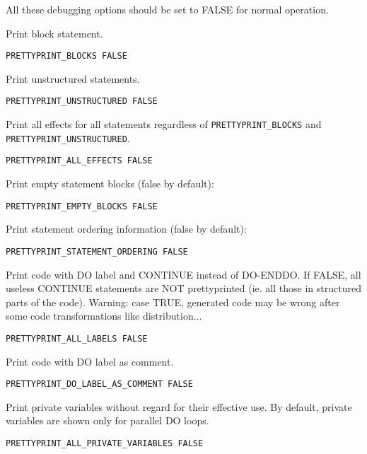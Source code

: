 All these debugging options should be set to FALSE for normal operation.

Print block statement.

\begin{verbatim}
PRETTYPRINT_BLOCKS FALSE
\end{verbatim}

Print unstructured statements.

\begin{verbatim}
PRETTYPRINT_UNSTRUCTURED FALSE
\end{verbatim}

Print all effects for all statements regardless of \verb+PRETTYPRINT_BLOCKS+
and \verb+PRETTYPRINT_UNSTRUCTURED+.

\begin{verbatim}
PRETTYPRINT_ALL_EFFECTS FALSE
\end{verbatim}

Print empty statement blocks (false by default):

\begin{verbatim}
PRETTYPRINT_EMPTY_BLOCKS FALSE
\end{verbatim}

Print statement ordering information (false by default):

\begin{verbatim}
PRETTYPRINT_STATEMENT_ORDERING FALSE
\end{verbatim}

Print code with DO label and CONTINUE instead of DO-ENDDO. If FALSE, all
useless CONTINUE statements are NOT prettyprinted (ie. all those in
structured parts of the code). Warning: case TRUE, generated code may be
wrong after some code transformations like distribution...

\begin{verbatim}
PRETTYPRINT_ALL_LABELS FALSE
\end{verbatim}

Print code with DO label as comment.

\begin{verbatim}
PRETTYPRINT_DO_LABEL_AS_COMMENT FALSE
\end{verbatim}

Print private variables without regard for their effective use. By
default, private variables are shown only for parallel DO loops.

\begin{verbatim}
PRETTYPRINT_ALL_PRIVATE_VARIABLES FALSE
\end{verbatim}



